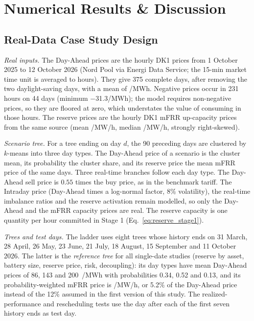 \documentclass[journal]{IEEEtran}
\begin{document}
\section{Numerical Results \& Discussion}

\subsection{Real-Data Case Study Design}
\label{sec:casestudy}
\textit{Real inputs.} The Day-Ahead prices are the hourly DK1 prices from 1 October 2025 to 12 October 2026 (Nord Pool via Energi Data Service; the 15-min market time unit is averaged to hours). They give 375 complete days, after removing the two daylight-saving days, with a mean of /MWh. Negative prices occur in 231 hours on 44 days (minimum \texteuro $-$31.3/MWh); the model requires non-negative prices, so they are floored at zero, which understates the value of consuming in those hours. The reserve prices are the hourly DK1 mFRR up-capacity prices from the same source (mean /MW/h, median /MW/h, strongly right-skewed).

\textit{Scenario tree.} For a tree ending on day $d$, the 90 preceding days are clustered by $k$-means into three day types. The Day-Ahead price of a scenario is the cluster mean, its probability the cluster share, and its reserve price the mean mFRR price of the same days. Three real-time branches follow each day type. The Day-Ahead sell price is $0.55$ times the buy price, as in the benchmark tariff. The Intraday price (Day-Ahead times a log-normal factor, 8\% volatility), the real-time imbalance ratios and the reserve activation remain modelled, so only the Day-Ahead and the mFRR capacity prices are real. The reserve capacity is one quantity per hour committed in Stage 1 (Eq.~\eqref{eq:reserve_stage1}).

\textit{Trees and test days.} The ladder uses eight trees whose history ends on 31 March, 28 April, 26 May, 23 June, 21 July, 18 August, 15 September and 11 October 2026. The latter is the \emph{reference tree} for all single-date studies (reserve by asset, battery size, reserve price, risk, decoupling): its day types have mean Day-Ahead prices of 86, 143 and 200~\texteuro/MWh with probabilities 0.34, 0.52 and 0.13, and its probability-weighted mFRR price is /MW/h, or 5.2\% of the Day-Ahead price instead of the 12\% assumed in the first version of this study. The realized-performance and rescheduling tests use the day after each of the first seven history ends as test day.
\end{document}
